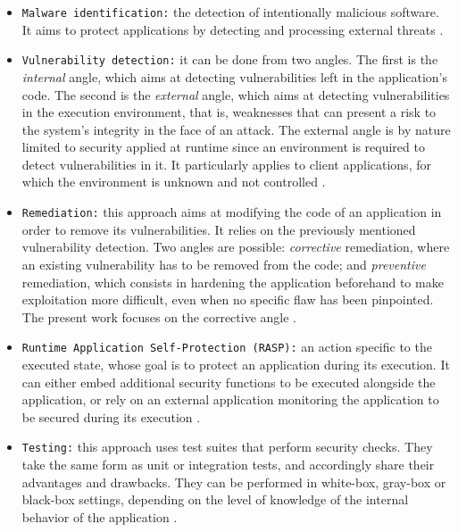 \begin{itemize}
  \item \texttt{Malware identification:} the detection of intentionally
        malicious software. It aims to protect applications by detecting
        and processing external threats \citep{placeholder-detection-survey}.
  \item \texttt{Vulnerability detection:} it can be done from two angles.
        The first is the \emph{internal} angle, which aims at detecting
        vulnerabilities left in the application's code. The second is the
        \emph{external} angle, which aims at detecting vulnerabilities in
        the execution environment, that is, weaknesses that can present a
        risk to the system's integrity in the face of an attack. The
        external angle is by nature limited to security applied at runtime
        since an environment is required to detect vulnerabilities in it.
        It particularly applies to client applications, for which the
        environment is unknown and not controlled \citep{placeholder-detection-survey}.
  \item \texttt{Remediation:} this approach aims at modifying the code of
        an application in order to remove its vulnerabilities. It relies
        on the previously mentioned vulnerability detection. Two angles
        are possible: \emph{corrective} remediation, where an existing
        vulnerability has to be removed from the code; and
        \emph{preventive} remediation, which consists in hardening the
        application beforehand to make exploitation more difficult,
        even when no specific flaw has been pinpointed. The present work
        focuses on the corrective angle \citep{placeholder-apr-survey}.
  \item \texttt{Runtime Application Self-Protection (RASP):} an action
        specific to the executed state, whose goal is to protect an
        application during its execution. It can either embed additional
        security functions to be executed alongside the application, or
        rely on an external application monitoring the application to be
        secured during its execution \citep{placeholder-iast}.
  \item \texttt{Testing:} this approach uses test suites that perform
        security checks. They take the same form as unit or integration
        tests, and accordingly share their advantages and drawbacks. They
        can be performed in white-box, gray-box or black-box settings,
        depending on the level of knowledge of the internal behavior of
        the application \citep{placeholder-sast}.
\end{itemize}

